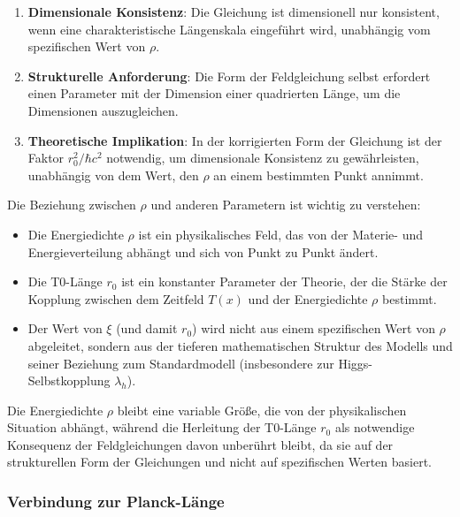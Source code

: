 \documentclass[12pt,a4paper]{article}
\newcommand{\Tfield}{T(x)}
\begin{document}
	\begin{enumerate}
		\item \textbf{Dimensionale Konsistenz}: Die Gleichung ist dimensionell nur konsistent, wenn eine charakteristische Längenskala eingeführt wird, unabhängig vom spezifischen Wert von \(\rho\).
		
		\item \textbf{Strukturelle Anforderung}: Die Form der Feldgleichung selbst erfordert einen Parameter mit der Dimension einer quadrierten Länge, um die Dimensionen auszugleichen.
		
		\item \textbf{Theoretische Implikation}: In der korrigierten Form der Gleichung ist der Faktor \(r_0^2/\hbar c^2\) notwendig, um dimensionale Konsistenz zu gewährleisten, unabhängig von dem Wert, den \(\rho\) an einem bestimmten Punkt annimmt.
	\end{enumerate}
	
	Die Beziehung zwischen \(\rho\) und anderen Parametern ist wichtig zu verstehen:
	\begin{itemize}
		\item Die Energiedichte \(\rho\) ist ein physikalisches Feld, das von der Materie- und Energieverteilung abhängt und sich von Punkt zu Punkt ändert.
		
		\item Die T0-Länge \(r_0\) ist ein konstanter Parameter der Theorie, der die Stärke der Kopplung zwischen dem Zeitfeld \(\Tfield\) und der Energiedichte \(\rho\) bestimmt.
		
		\item Der Wert von \(\xi\) (und damit \(r_0\)) wird nicht aus einem spezifischen Wert von \(\rho\) abgeleitet, sondern aus der tieferen mathematischen Struktur des Modells und seiner Beziehung zum Standardmodell (insbesondere zur Higgs-Selbstkopplung \(\lambda_h\)).
	\end{itemize}
	
	Die Energiedichte \(\rho\) bleibt eine variable Größe, die von der physikalischen Situation abhängt, während die Herleitung der T0-Länge \(r_0\) als notwendige Konsequenz der Feldgleichungen davon unberührt bleibt, da sie auf der strukturellen Form der Gleichungen und nicht auf spezifischen Werten basiert.
	
	\subsubsection{Verbindung zur Planck-Länge}
	
\end{document}
